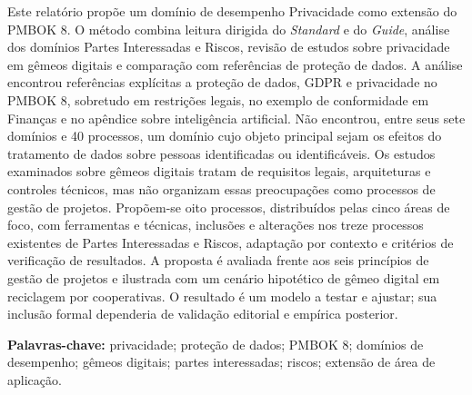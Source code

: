 \documentclass[12pt,a4paper,article,oneside,english,brazil]{abntex2}
\begin{document}
\begin{resumo}
Este relatório propõe um domínio de desempenho Privacidade como extensão do PMBOK 8. O método combina leitura dirigida do \textit{Standard} e do \textit{Guide}, análise dos domínios Partes Interessadas e Riscos, revisão de estudos sobre privacidade em gêmeos digitais e comparação com referências de proteção de dados. A análise encontrou referências explícitas a proteção de dados, GDPR e privacidade no PMBOK 8, sobretudo em restrições legais, no exemplo de conformidade em Finanças e no apêndice sobre inteligência artificial. Não encontrou, entre seus sete domínios e 40 processos, um domínio cujo objeto principal sejam os efeitos do tratamento de dados sobre pessoas identificadas ou identificáveis. Os estudos examinados sobre gêmeos digitais tratam de requisitos legais, arquiteturas e controles técnicos, mas não organizam essas preocupações como processos de gestão de projetos. Propõem-se oito processos, distribuídos pelas cinco áreas de foco, com ferramentas e técnicas, inclusões e alterações nos treze processos existentes de Partes Interessadas e Riscos, adaptação por contexto e critérios de verificação de resultados. A proposta é avaliada frente aos seis princípios de gestão de projetos e ilustrada com um cenário hipotético de gêmeo digital em reciclagem por cooperativas. O resultado é um modelo a testar e ajustar; sua inclusão formal dependeria de validação editorial e empírica posterior.

\vspace{\onelineskip}
\noindent\textbf{Palavras-chave:} privacidade; proteção de dados; PMBOK 8; domínios de desempenho; gêmeos digitais; partes interessadas; riscos; extensão de área de aplicação.
\end{resumo}
\end{document}
